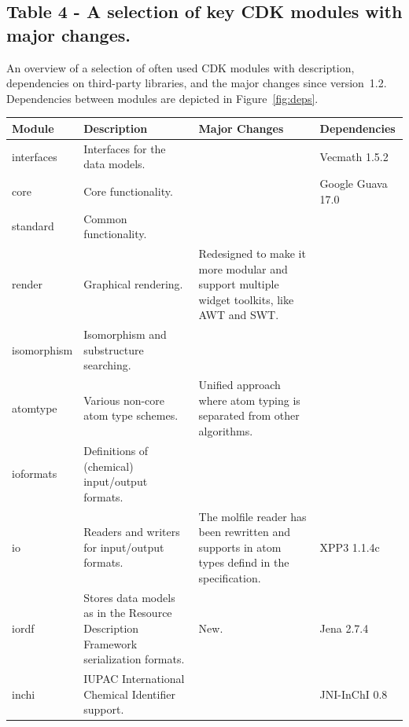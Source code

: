 \documentclass[doublespacing]{bmcart}
\begin{document}
\begin{backmatter}
\newpage
    
      \subsection*{Table 4 - A selection of key CDK modules with major changes.}\label{tab:modules}
  An overview of a selection of often used CDK modules with description,
  dependencies on third-party libraries, and the major changes since
  version~1.2. Dependencies between modules are depicted in Figure~\ref{fig:deps}.
  \baselineskip

    \begin{minipage}{1\textwidth}
    \renewcommand*{\thempfootnote}{\fnsymbol{mpfootnote}}
    \centering
    \begin{tabular}{lp{3cm}p{3cm}l}
  \textbf{Module}            & \textbf{Description}  & \textbf{Major Changes} & \textbf{Dependencies} \\ \hline
  interfaces                 & Interfaces for the data models. & & Vecmath 1.5.2 \\ \hline
  core                       & Core functionality.             & & Google Guava 17.0 \\ \hline %
  standard                   & Common functionality.           & & \\ \hline
  render                     & Graphical rendering.            & Redesigned to make it more modular and support multiple widget toolkits, like AWT and SWT. & \\ \hline
  isomorphism                & Isomorphism and substructure searching. & & \\ \hline
  atomtype                   & Various non-core atom type schemes.     & Unified approach where atom typing is separated from other algorithms. & \\ \hline
  ioformats                  & Definitions of (chemical) input/output formats. & & \\ \hline
  io                         & Readers and writers for input/output formats.  & The molfile reader has been rewritten and supports in atom types defind in the specification. & XPP3 1.1.4c \\ \hline
  iordf                      & Stores data models as in the Resource Description Framework serialization formats. & New. & Jena 2.7.4 \\ \hline
  inchi                      & IUPAC International Chemical Identifier support. & & JNI-InChI 0.8~\cite{Spjuth2013}  \\ \hline

\end{tabular}
\end{minipage}
\end{backmatter}
\end{document}
